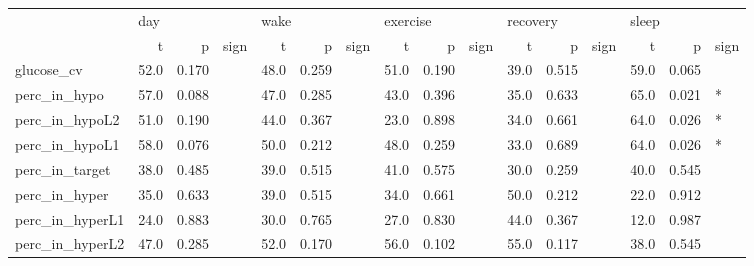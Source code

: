 \begin{tabular}{lrrlrrlrrlrrlrrl}
\toprule
{} & \multicolumn{3}{l}{day} & \multicolumn{3}{l}{wake} & \multicolumn{3}{l}{exercise} & \multicolumn{3}{l}{recovery} & \multicolumn{3}{l}{sleep} \\
{} &     t &      p & sign &     t &      p & sign &        t &      p & sign &        t &      p & sign &     t &      p & sign \\
\midrule
glucose_cv      &  52.0 &  0.170 &      &  48.0 &  0.259 &      &     51.0 &  0.190 &      &     39.0 &  0.515 &      &  59.0 &  0.065 &      \\
perc_in_hypo    &  57.0 &  0.088 &      &  47.0 &  0.285 &      &     43.0 &  0.396 &      &     35.0 &  0.633 &      &  65.0 &  0.021 &    * \\
perc_in_hypoL2  &  51.0 &  0.190 &      &  44.0 &  0.367 &      &     23.0 &  0.898 &      &     34.0 &  0.661 &      &  64.0 &  0.026 &    * \\
perc_in_hypoL1  &  58.0 &  0.076 &      &  50.0 &  0.212 &      &     48.0 &  0.259 &      &     33.0 &  0.689 &      &  64.0 &  0.026 &    * \\
perc_in_target  &  38.0 &  0.485 &      &  39.0 &  0.515 &      &     41.0 &  0.575 &      &     30.0 &  0.259 &      &  40.0 &  0.545 &      \\
perc_in_hyper   &  35.0 &  0.633 &      &  39.0 &  0.515 &      &     34.0 &  0.661 &      &     50.0 &  0.212 &      &  22.0 &  0.912 &      \\
perc_in_hyperL1 &  24.0 &  0.883 &      &  30.0 &  0.765 &      &     27.0 &  0.830 &      &     44.0 &  0.367 &      &  12.0 &  0.987 &      \\
perc_in_hyperL2 &  47.0 &  0.285 &      &  52.0 &  0.170 &      &     56.0 &  0.102 &      &     55.0 &  0.117 &      &  38.0 &  0.545 &      \\
\bottomrule
\end{tabular}
